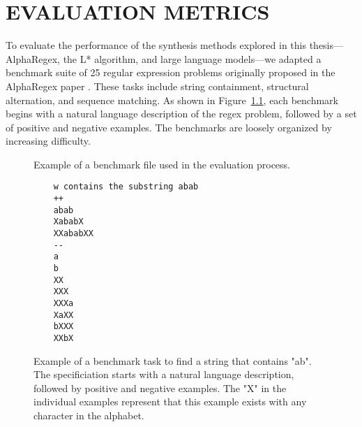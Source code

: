 %
%
%


\chapter{EVALUATION METRICS}


\indent\indent To evaluate the performance of the synthesis methods explored in this thesis—AlphaRegex, the L* algorithm, and large language models—we adapted a benchmark suite of 25 regular expression problems originally proposed in the AlphaRegex paper \cite{lee_2016_synthesizing}. These tasks include string containment, structural alternation, and sequence matching. As shown in Figure~\ref{fig:benchmark-example}, each benchmark begins with a natural language description of the regex problem, followed by a set of positive and negative examples. The benchmarks are loosely organized by increasing difficulty.

\begin{figure}[h!]
	\centering
	Example of a benchmark file used in the evaluation process.
	\begin{verbatim}
	w contains the substring abab
	++
	abab
	XababX
	XXababXX
	--
	a
	b
	XX
	XXX
	XXXa
	XaXX
	bXXX
	XXbX
	\end{verbatim}
	\captionsetup{justification=centering}
	\caption{Example of a benchmark task to find a string that contains "ab". The specificiation starts with a natural language description, followed by positive and negative examples. The "X" in the individual examples represent that this example exists with any character in the alphabet.}
	\label{fig:benchmark-example}
\end{figure}

